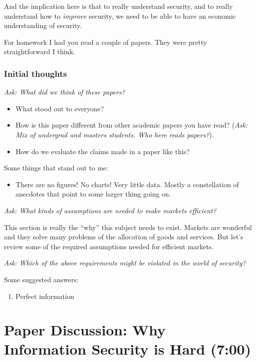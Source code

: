 \documentclass[11pt]{article}
\begin{document}
And the implication here is that to really understand security, and to really understand how to \textit{improve} security, we need to be able to have an economic understanding of security. 

For homework I had you read a couple of papers. They were pretty straightforward I think.

\subsubsection{Initial thoughts}

{\it Ask: What did we think of these papers?}

\begin{itemize}
    \item What stood out to everyone?
    \item How is this paper different from other academic papers you have read? ({\it Ask: Mix of undergrad and masters students. Who here reads papers?}). 
    \item How do we evaluate the claims made in a paper like this?
\end{itemize}

Some things that stand out to me:

\begin{itemize}
    \item There are no figures! No charts! Very little data. Mostly a constellation of anecdotes that point to some larger thing going on.
\end{itemize}

{\it Ask: What kinds of assumptions are needed to make markets efficient?}


This section is really the ``why'' this subject needs to exist. 
Markets are wonderful and they solve many problems of the allocation of goods and services.
But let's review some of the required assumptions needed for efficient markets.

{\it Ask: Which of the above requirements might be violated in the world of security?}

Some suggested answers:
\begin{enumerate}
    \item Perfect information
\end{enumerate}

\section{Paper Discussion: Why Information Security is Hard (7:00)}
\end{document}
